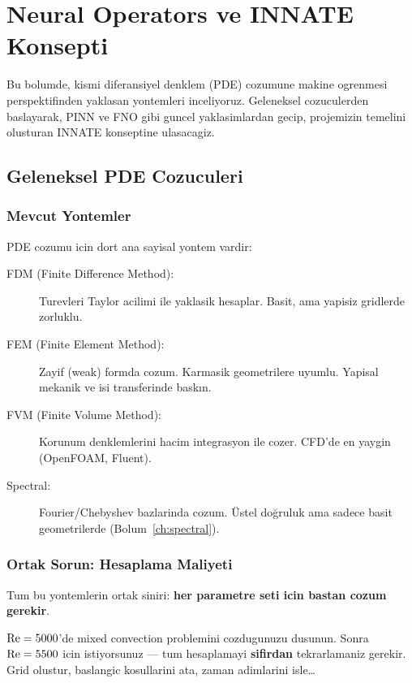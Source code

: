 \chapter{Neural Operators ve INNATE Konsepti}
\label{ch:neural_operators}

Bu bolumde, kismi diferansiyel denklem (PDE) cozumune makine ogrenmesi perspektifinden yaklasan yontemleri inceliyoruz. Geleneksel cozuculerden baslayarak, PINN ve FNO gibi guncel yaklasimlardan gecip, projemizin temelini olusturan INNATE konseptine ulasacagiz.


\section{Geleneksel PDE Cozuculeri}
\label{sec:geleneksel}

\subsection{Mevcut Yontemler}

PDE cozumu icin dort ana sayisal yontem vardir:

\begin{description}
\item[FDM (Finite Difference Method):] Turevleri Taylor acilimi ile yaklasik hesaplar. Basit, ama yapisiz gridlerde zorluklu.
\item[FEM (Finite Element Method):] Zayif (weak) formda cozum. Karmasik geometrilere uyumlu. Yapisal mekanik ve isi transferinde baskın.
\item[FVM (Finite Volume Method):] Korunum denklemlerini hacim integrasyon ile cozer. CFD'de en yaygin (OpenFOAM, Fluent).
\item[Spectral:] Fourier/Chebyshev bazlarinda cozum. Üstel doğruluk ama sadece basit geometrilerde (Bolum~\ref{ch:spectral}).
\end{description}

\subsection{Ortak Sorun: Hesaplama Maliyeti}

Tum bu yontemlerin ortak siniri: \textbf{her parametre seti icin bastan cozum gerekir}.

$\mathrm{Re} = 5000$'de mixed convection problemini cozdugunuzu dusunun. Sonra $\mathrm{Re} = 5500$ icin istiyorsunuz --- tum hesaplamayi \textbf{sifirdan} tekrarlamaniz gerekir. Grid olustur, baslangic kosullarini ata, zaman adimlarini isle\ldots

